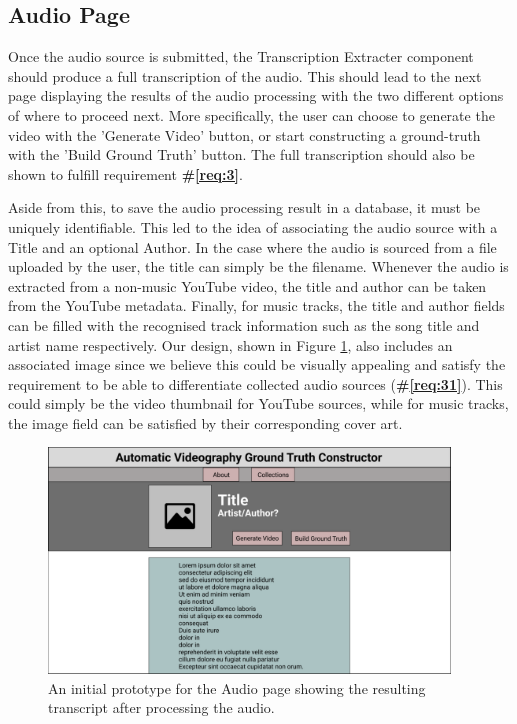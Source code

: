 \documentclass{l4proj}
\begin{document}
\subsection{Audio Page}
Once the audio source is submitted, the Transcription Extracter component should produce a full transcription of the audio. This should lead to the next page displaying the results of the audio processing with the two different options of where to proceed next. More specifically, the user can choose to generate the video with the 'Generate Video' button, or start constructing a ground-truth with the 'Build Ground Truth' button. The full transcription should also be shown to fulfill requirement \textbf{\#\ref{req:3}}. 

Aside from this, to save the audio processing result in a database, it must be uniquely identifiable. This led to the idea of associating the audio source with a Title and an optional Author. In the case where the audio is sourced from a file uploaded by the user, the title can simply be the filename. Whenever the audio is extracted from a non-music YouTube video, the title and author can be taken from the YouTube metadata. Finally, for music tracks, the title and author fields can be filled with the recognised track information such as the song title and artist name respectively. Our design, shown in Figure \ref{fig:audio_page}, also includes an associated image since we believe this could be visually appealing and satisfy the requirement to be able to differentiate collected audio sources (\textbf{\#\ref{req:31}}). This could simply be the video thumbnail for YouTube sources, while for music tracks, the image field can be satisfied by their corresponding cover art. 

\begin{figure}
    \centering
    \includegraphics[width=0.95\textwidth]{figures/audio_page.pdf}
    \caption{An initial prototype for the Audio page showing the resulting transcript after processing the audio.}
    \label{fig:audio_page}
\end{figure}
\end{document}
